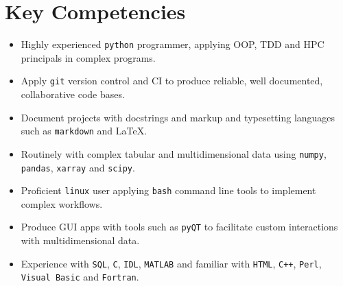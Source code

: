 \documentclass[12pt,a4paper,sans]{moderncv}        %
\begin{document}
\makecvtitle
\vspace*{-0.85cm}

\section{Key Competencies}
{\begin{itemize}%
\item Highly experienced \textcolor{mypurple}{\texttt{python} programmer}, applying OOP, TDD and HPC principals in complex programs.%
\item Apply \texttt{git} \textcolor{mypurple}{version control} and \textcolor{mypurple}{CI} to produce reliable, well documented, collaborative code bases. %
\item \textcolor{mypurple}{Document projects} with docstrings and markup and typesetting languages such as \texttt{markdown} and \LaTeX.
\item Routinely with complex \textcolor{mypurple}{tabular} and \textcolor{mypurple}{multidimensional data} using \texttt{numpy}, \texttt{pandas}, \texttt{xarray} and \texttt{scipy}.
\item Proficient \textcolor{mypurple}{\texttt{linux}} user applying \texttt{bash} command line tools to implement complex workflows. 
\item Produce \textcolor{mypurple}{GUI apps} with tools such as \texttt{pyQT} to facilitate custom interactions with multidimensional data.
\item Experience with \textcolor{mypurple}{\texttt{SQL}}, \texttt{C}, \texttt{IDL}, \texttt{MATLAB} and familiar with \texttt{HTML}, \texttt{C++},  \texttt{Perl},  \texttt{Visual Basic} and \texttt{Fortran}. %
\end{itemize}}
\end{document}
